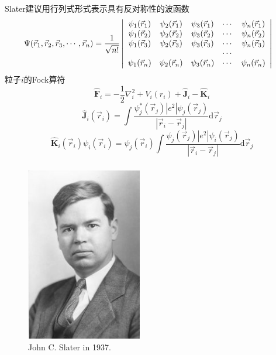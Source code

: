 {{	\textrm{Slater}建议用行列式形式表示具有反对称性的波函数
	\begin{displaymath}
		\hspace*{-10pt}\Psi(\vec r_1,\vec r_2,\vec r_3,\cdots,\vec r_n)=\dfrac1{\sqrt{n!}}
		\left|\begin{array}{ccccc}
			\psi_1(\vec r_1)&\psi_2(\vec r_1)&\psi_3(\vec r_1)&\cdots&\psi_n(\vec r_1)\\
			\psi_1(\vec r_2)&\psi_2(\vec r_2)&\psi_3(\vec r_2)&\cdots&\psi_n(\vec r_2)\\
			\psi_1(\vec r_3)&\psi_2(\vec r_3)&\psi_3(\vec r_3)&\cdots&\psi_n(\vec r_3)\\
			&&&\cdots&\\
			\psi_1(\vec r_n)&\psi_2(\vec r_n)&\psi_3(\vec r_n)&\cdots&\psi_n(\vec r_n)
		\end{array}\right|
	\end{displaymath}
	粒子$i$的\textrm{Fock}算符
	$$\hat{\mathbf F}_i=-\dfrac{1}{2}\nabla_i^2+V_i(r_i)+\hat{\mathbf J}_i-\hat{\mathbf K}_i$$
	$$\hat{\mathbf J}_i(\vec r_i)=\int\dfrac{\psi_j^{\ast}(\vec r_j)|e^2|\psi_j(\vec r_j)}{|\vec r_i-\vec r_j|}\mathrm{d}\vec r_j$$
	$$\hat{\mathbf K}_i(\vec r_i)\psi_i(\vec r_i)=\psi_j(\vec r_i)\int\dfrac{\psi_j(\vec r_j)|e^2|\psi_i(\vec r_j)}{|\vec r_i-\vec r_j|}\mathrm{d}\vec r_j$$

}

\frame
{
	\frametitle{}
\begin{figure}[h!]
\centering
\vspace{-0.5pt}
\includegraphics[height=0.65\textwidth,width=0.45\textwidth,viewport=0 0 210 310,clip]{Figures/John-C-Slater_1937.jpg}
\caption{\tiny\textrm{John C. Slater in 1937.}}
\label{Fig_Slater}
\end{figure}
}

}
